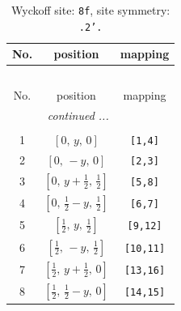 \documentclass[fleqn,8pt]{jsarticle}
\begin{document}
\begin{longtable}{ccc}
\caption{Wyckoff site: {\tt 8f}, site symmetry: {\tt .2'.}}
 \\
 \hline \hline
No. & position & mapping \\ \hline \endfirsthead

\multicolumn{2}{l}{\tablename\ \thetable{}} \\
 \hline \hline
No. & position & mapping \\ \hline \endhead

 \hline \hline
\multicolumn{2}{r}{\footnotesize\it continued ...} \\ \endfoot

 \hline \hline
\multicolumn{2}{r}{} \\ \endlastfoot

1 & $\left[ 0,\, y,\, 0 \right]$ & {\tt [1,4]} \\ \hline
2 & $\left[ 0,\, - y,\, 0 \right]$ & {\tt [2,3]} \\ \hline
3 & $\left[ 0,\, y + \frac{1}{2},\, \frac{1}{2} \right]$ & {\tt [5,8]} \\ \hline
4 & $\left[ 0,\, \frac{1}{2} - y,\, \frac{1}{2} \right]$ & {\tt [6,7]} \\ \hline
5 & $\left[ \frac{1}{2},\, y,\, \frac{1}{2} \right]$ & {\tt [9,12]} \\ \hline
6 & $\left[ \frac{1}{2},\, - y,\, \frac{1}{2} \right]$ & {\tt [10,11]} \\ \hline
7 & $\left[ \frac{1}{2},\, y + \frac{1}{2},\, 0 \right]$ & {\tt [13,16]} \\ \hline
8 & $\left[ \frac{1}{2},\, \frac{1}{2} - y,\, 0 \right]$ & {\tt [14,15]} \\
\end{longtable}
\renewcommand{\arraystretch}{1.2}
\end{document}

